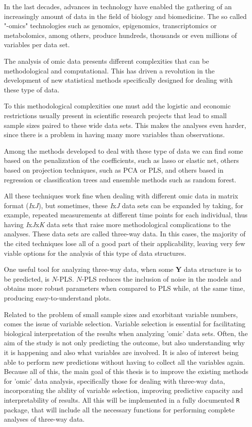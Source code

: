 In the last decades, advances in technology have enabled the gathering of an increasingly amount of data in the field of biology and biomedicine. The so called "-omics" technologies such as genomics, epigenomics, transcriptomics or metabolomics, among others, produce hundreds, thousands or even millions of variables per data set.

The analysis of omic data presents different complexities that can be methodological and computational. This has driven a revolution in the development of new statistical methods specifically designed for dealing with these type of data. 

To this methodological complexities one must add the logistic and economic restrictions usually present in scientific research projects that lead to small sample sizes paired to these wide data sets. This makes the analyses even harder, since there is a problem in having many more variables than observations.

Among the methods developed to deal with these type of data we can find some based on the penalization of the coefficients, such as lasso or elastic net, others based on projection techniques, such as PCA or PLS, and others based in regression or classification trees and ensemble methods such as random forest.

All these techniques work fine when dealing with different omic data in matrix format (\textit{I}x\textit{J}), but sometimes, these \textit{I}x\textit{J} data sets can be expanded by taking, for example, repeated measurements at different time points for each individual, thus having \textit{I}x\textit{J}x\textit{K} data sets that raise more methodological complications to the analyses. These data sets are called three-way data. In this cases, the majority of the cited techniques lose all of a good part of their applicability, leaving very few viable options for the analysis of this type of data structures.

One useful tool for analyzing three-way data, when some \textbf{Y} data structure is to be predicted, is $N$-PLS. $N$-PLS reduces the inclusion of noise in the models and obtains more robust parameters when compared to PLS while, at the same time, producing easy-to-understand plots.

Related to the problem of small sample sizes and exorbitant variable numbers, comes the issue of variable selection. Variable selection is essential for facilitating biological interpretation of the results when analyzing 'omic' data sets. Often, the aim of the study is not only predicting the outcome, but also understanding why it is happening and also what variables are involved. It is also of interest being able to perform new predictions without having to collect all the variables again. Because all of this, the main goal of this thesis is to improve the existing methods for 'omic' data analysis, specifically those for dealing with three-way data, incorporating the ability of variable selection, improving predictive capacity and interpretability of results. All this will be implemented in a fully documented \texttt{R} package, that will include all the necessary functions for performing complete analyses of three-way data.

